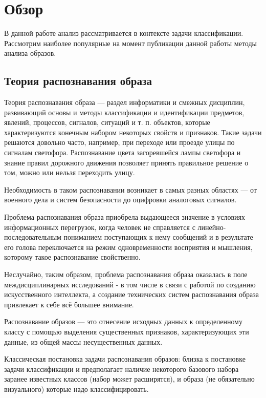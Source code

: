 \chapter{Обзор} \label{chapt2}
В данной работе анализ рассматривается в контексте задачи классификации. Рассмотрим наиболее популярные на момент публикации данной работы методы анализа образов.

\section{Теория распознавания образа}

Теория распознавания образа — раздел информатики и смежных дисциплин, развивающий основы и методы классификации и идентификации предметов, явлений, процессов, сигналов, ситуаций и т. п. объектов, которые характеризуются конечным набором некоторых свойств и признаков. Такие задачи решаются довольно часто, например, при переходе или проезде улицы по сигналам светофора. Распознавание цвета загоревшейся лампы светофора и знание правил дорожного движения позволяет принять правильное решение о том, можно или нельзя переходить улицу.

Необходимость в таком распознавании возникает в самых разных областях — от военного дела и систем безопасности до оцифровки аналоговых сигналов.

Проблема распознавания образа приобрела выдающееся значение в условиях информационных перегрузок, когда человек не справляется с линейно-последовательным пониманием поступающих к нему сообщений и в результате его голова переключается на режим одновременности восприятия и мышления, которому такое распознавание свойственно.

Неслучайно, таким образом, проблема распознавания образа оказалась в поле междисциплинарных исследований - в том числе в связи с работой по созданию искусственного интеллекта, а создание технических систем распознавания образа привлекает к себе всё большее внимание.

Распознавание образов — это отнесение исходных данных к определенному классу с помощью выделения существенных признаков, характеризующих эти данные, из общей массы несущественных данных.

Классическая постановка задачи распознавания образов: близка к постановке задачи классификации и предполагает наличие некоторого базового набора заранее известных классов (набор может расширятся), и образа (не обязательно визуального) которые надо классифицировать.

